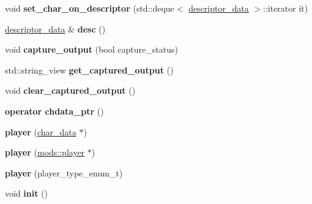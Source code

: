 \begin{DoxyCompactItemize}
\item 
\mbox{\label{classmods_1_1player_ae0103c5de79432ccac31533bda656fa9}} 
void {\bfseries set\+\_\+char\+\_\+on\+\_\+descriptor} (std\+::deque$<$ \hyperlink{structmods_1_1descriptor__data}{descriptor\+\_\+data} $>$\+::iterator it)
\item 
\mbox{\label{classmods_1_1player_a29c2b6b239cd337779e6c78794337e9d}} 
\hyperlink{structmods_1_1descriptor__data}{descriptor\+\_\+data} \& {\bfseries desc} ()
\item 
\mbox{\label{classmods_1_1player_a9b9ce853251b47cecf9a355010af8191}} 
void {\bfseries capture\+\_\+output} (bool capture\+\_\+status)
\item 
\mbox{\label{classmods_1_1player_a71cf4e3a0c9a61cd769b42e889648901}} 
std\+::string\+\_\+view {\bfseries get\+\_\+captured\+\_\+output} ()
\item 
\mbox{\label{classmods_1_1player_a4105554f0492c385628f95873db9f43d}} 
void {\bfseries clear\+\_\+captured\+\_\+output} ()
\item 
\mbox{\label{classmods_1_1player_a5495b32c08d7c6d90508828d56cd917c}} 
{\bfseries operator chdata\+\_\+ptr} ()
\item 
\mbox{\label{classmods_1_1player_ad8976300005b211fd9c5ccafcf523de6}} 
{\bfseries player} (\hyperlink{structchar__data}{char\+\_\+data} $\ast$)
\item 
\mbox{\label{classmods_1_1player_abab6e7c067da6cac1c9e8bd2debbca7a}} 
{\bfseries player} (\hyperlink{classmods_1_1player}{mods\+::player} $\ast$)
\item 
\mbox{\label{classmods_1_1player_a140e9fa644bed00bada74ce47150fb5d}} 
{\bfseries player} (player\+\_\+type\+\_\+enum\+\_\+t)
\item 
\mbox{\label{classmods_1_1player_ac28bbd514e0f3d935f7c849ff61528c8}} 
void {\bfseries init} ()
\item 
\mbox{\label{classmods_1_1player_a39615043bf34c00e83a08b8d9e58112b}} 

\end{DoxyCompactItemize}
